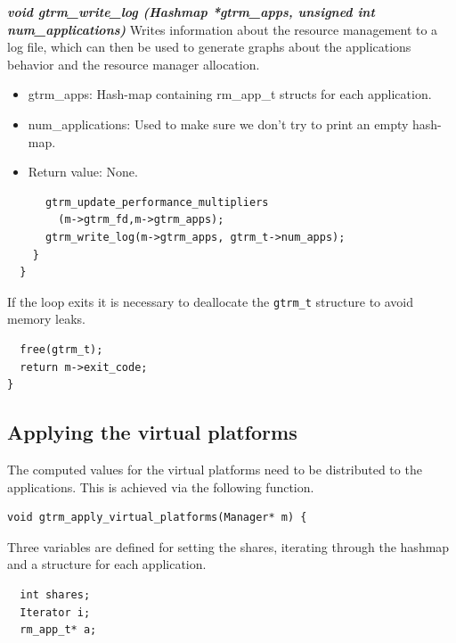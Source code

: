 \documentclass[nobiblatex]{LTHthesis}
\begin{document}
\begin{framed}
	\begin{flushleft}
		\textbf{\emph{{void gtrm\_write\_log \newline
    (Hashmap *gtrm\_apps, unsigned int num\_applications)}}} \newline
		Writes information about the resource management to a log file, 
    which can then be used to generate graphs about the applications
    behavior and the resource manager allocation.
		\begin{itemize} 
		\item gtrm\_apps: Hash-map containing rm\_app\_t structs for 
      each application.
		\item num\_applications: Used to make sure we don't try to print 
      an empty hash-map.
		\item Return value: None.
	  \end{itemize}
  \end{flushleft}	
\end{framed}

\begin{lstlisting}
      gtrm_update_performance_multipliers
        (m->gtrm_fd,m->gtrm_apps);
      gtrm_write_log(m->gtrm_apps, gtrm_t->num_apps);
    }
  }
\end{lstlisting}

If the loop exits it is necessary to deallocate the \texttt{gtrm\_t} 
structure to avoid memory leaks.
\begin{lstlisting}
  free(gtrm_t);
  return m->exit_code;
}
\end{lstlisting}

\subsection{Applying the virtual platforms}

The computed values for the virtual platforms need to be distributed to 
the applications. This is achieved via the following function.
\begin{lstlisting}
void gtrm_apply_virtual_platforms(Manager* m) {
\end{lstlisting}

Three variables are defined for setting the shares, iterating through 
the hashmap and a structure for each application.
\begin{lstlisting}
  int shares;
  Iterator i;
  rm_app_t* a;
\end{lstlisting}
\end{document}
